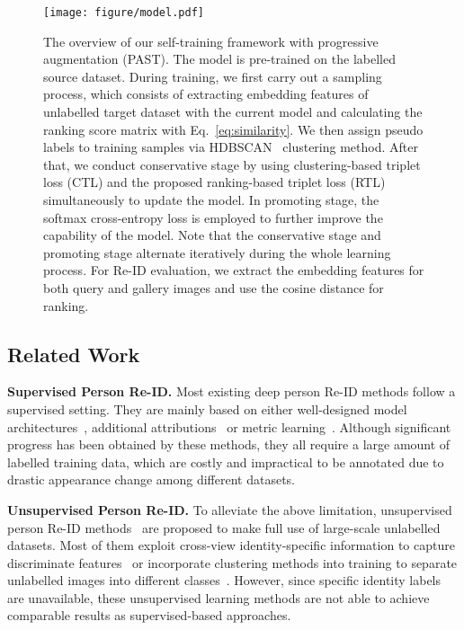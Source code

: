 \documentclass[10pt,twocolumn,letterpaper]{article}
\begin{document}
\begin{figure*}[t]
\centering
\texttt{[image: figure/model.pdf]}
\setlength{\abovecaptionskip}{0.013cm} 
\caption{The overview of our self-training framework with progressive augmentation (PAST). The model is pre-trained on the labelled source dataset. During training, we first carry out a sampling process, which consists of extracting embedding features of unlabelled target dataset with the current model and calculating the ranking score matrix with Eq.~\eqref{eq:similarity}. We then assign pseudo labels to training samples via HDBSCAN~\cite{HDBSCAN} clustering method. 
After that, we conduct conservative stage by using clustering-based triplet loss (CTL) and the proposed ranking-based triplet loss (RTL) simultaneously to update the model. 
In promoting stage, the softmax cross-entropy loss is employed to further improve the capability of the model. 
Note that the conservative stage and promoting stage alternate iteratively during the whole learning process.
For Re-ID evaluation, we extract the embedding features for both query and gallery images and use the cosine distance for ranking.} 
\label{fig:model}
\end{figure*}


\subsection{Related Work}
\noindent\textbf{Supervised Person Re-ID.} Most existing deep person Re-ID methods follow a supervised setting. They are mainly based on either well-designed model architectures~\cite{PCB, multichannel, cascaded, multiregion, AlignedReID, AACN, DPFL, MLFN}, additional attributions~\cite{mask2stream, MGCAM, CamStyle, MTDnet} or metric learning~\cite{DTL, batchhardtriplet, lisanti2015person, rerank}. Although significant progress has been obtained by these methods, they all require a large amount of labelled training data, which are costly and impractical to be annotated due to drastic appearance change among different datasets. 

\noindent\textbf{Unsupervised Person Re-ID.} To alleviate the above limitation, unsupervised person Re-ID methods~\cite{CAMEL, stepwise, BUC, WangGX14, WangZXG16} are proposed to make full use of large-scale unlabelled datasets. Most of them exploit cross-view identity-specific information to capture discriminate features~\cite{CAMEL, WangZXG16} or incorporate clustering methods into training to separate unlabelled images into different classes~\cite{BUC, stepwise}. However, since specific identity labels are unavailable, these unsupervised learning methods are not able to achieve  comparable results as supervised-based approaches.
\end{document}
